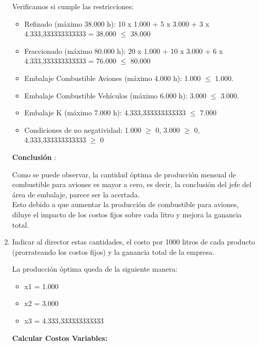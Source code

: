 \documentclass[10pt,a4paper]{article}
\begin{document}
\begin{enumerate}
\begin{itemize}
    \end{itemize}

    Verificamos si cumple las restricciones:

    \begin{itemize}

        \item Refinado (máximo 38.000 h): 10 x 1.000 + 5 x 3.000 + 3 x 4.333,333333333333 = 38.000 $\leq$ 38.000
        \item Fraccionado (máximo 80.000 h): 20 x 1.000 + 10 x 3.000 + 6 x 4.333,333333333333 = 76.000 $\leq$ 80.000
        \item Embalaje Combustible Aviones (máximo 4.000 h): 1.000 $\leq$ 1.000.
        \item Embalaje Combustible Vehículos (máximo 6.000 h): 3.000 $\leq$ 3.000.
        \item Embalaje K (máximo 7.000 h): 4.333,333333333333 $\leq$ 7.000
        \item Condiciones de no negatividad: 1.000 $\geq$ 0, 3.000 $\geq$ 0, 4.333,333333333333 $\geq$ 0\\

    \end{itemize}

    \textbf{Conclusión }:

    Como se puede observar, la cantidad óptima de producción mensual de combustible para aviones es mayor a cero, es 
    decir, la conclusión del jefe del área de embalaje, parece ser la acertada. \\
    Esto debido a que aumentar la producción de combustible para aviones, diluye el impacto de los costos fijos sobre cada litro y 
    mejora la ganancia total.


    \item Indicar al director estas cantidades, el costo por 1000 litros de cada producto (prorrateando los costos fijos)
     y la ganancia total de la empresa.

     La producción óptima queda de la siguiente manera:

     \begin{itemize}

        \item x1 = 1.000
        \item x2 = 3.000
        \item x3 = 4.333,333333333333

    \end{itemize}


     \textbf{Calcular Costos Variables:} \\


\end{enumerate}
\end{document}
